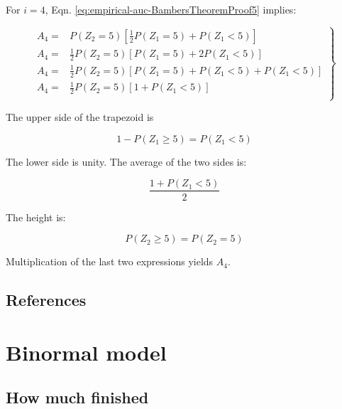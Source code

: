 \documentclass[
]{book}
\begin{document}
For \(i = 4\), Eqn. \eqref{eq:empirical-auc-BambersTheoremProof5} implies:

\begin{equation}
\left.
\begin{aligned}
A_4 =& P\left ( Z_2=5 \right )\left [ \frac{1}{2}P\left ( Z_1=5 \right ) + P\left ( Z_1<5 \right )\right ] \\
A_4 =& \frac{1}{2}P\left ( Z_2=5 \right )\left [ P\left ( Z_1=5 \right ) + 2P\left ( Z_1<5 \right )\right ] \\
A_4 =& \frac{1}{2}P\left ( Z_2=5 \right )\left [ P\left ( Z_1=5 \right ) +P\left ( Z_1<5 \right ) + P\left ( Z_1<5 \right )\right ] \\
A_4 =& \frac{1}{2}P\left ( Z_2=5 \right )\left [ 1 + P\left ( Z_1<5 \right )\right ] \\
\end{aligned}
\right \}
\end{equation}

The upper side of the trapezoid is

\begin{equation}
1-P\left ( Z_1 \geq 5 \right )= P\left ( Z_1 < 5 \right )
\end{equation}

The lower side is unity. The average of the two sides is:

\begin{equation}
\frac{1 + P\left ( Z_1 < 5 \right )}{2}
\end{equation}

The height is:

\begin{equation}
P\left ( Z_2 \geq 5 \right ) = P\left ( Z_2 = 5 \right )
\end{equation}

Multiplication of the last two expressions yields \(A_4\).

\hypertarget{empirical-auc-references}{%
\section{References}\label{empirical-auc-references}}

\hypertarget{binormal-model}{%
\chapter{Binormal model}\label{binormal-model}}

\hypertarget{binormal-model-how-much-finished}{%
\section{How much finished}\label{binormal-model-how-much-finished}}
\end{document}
